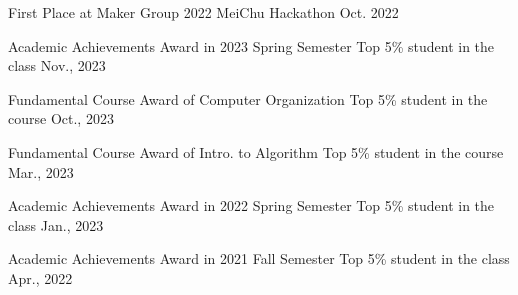 



\begin{cvhonors}
%
\cvhonor
{First Place at Maker Group} 
{2022 MeiChu Hackathon} 
{} 
{Oct. 2022}

%

\end{cvhonors}




\begin{cvhonors}



\cvhonor
{Academic Achievements Award in 2023 Spring Semester} 
{Top 5\% student in the class} 
{} 
{Nov., 2023}

\cvhonor
{Fundamental Course Award of Computer Organization}
{Top 5\% student in the course} 
{} 
{Oct., 2023}

\cvhonor
{Fundamental Course Award of Intro. to Algorithm} 
{Top 5\% student in the course} 
{} 
{Mar., 2023}


\cvhonor
{Academic Achievements Award in 2022 Spring Semester} 
{Top 5\% student in the class} 
{} 
{Jan., 2023}

\cvhonor
{Academic Achievements Award in 2021 Fall Semester} 
{Top 5\% student in the class} 
{} 
{Apr., 2022}

\end{cvhonors}